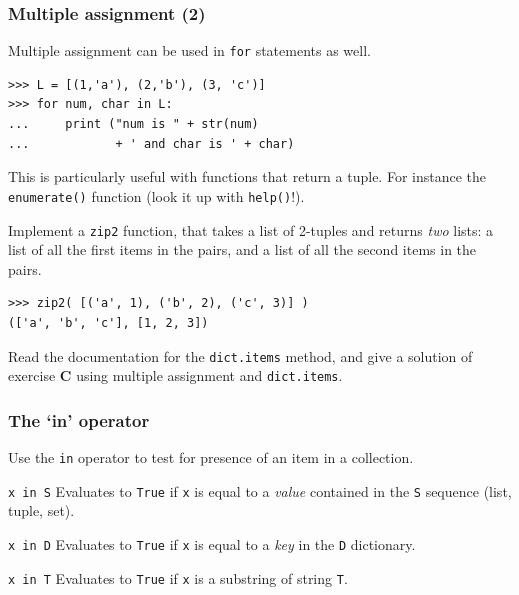\documentclass[english,serif,mathserif,xcolor=pdftex,dvipsnames,table]{beamer}
\begin{document}
\begin{frame}[fragile]
\frametitle{Multiple assignment (2)}
Multiple assignment can be used in \texttt{for} statements as well.
\begin{lstlisting}
>>> L = [(1,'a'), (2,'b'), (3, 'c')]
>>> for num, char in L:
...     print ("num is " + str(num)
...            + ' and char is ' + char)
\end{lstlisting}

  \+
  This is particularly useful with functions that return a tuple.
  For instance the \texttt{enumerate()} function (look it up with
  \texttt{help()}!).
\end{frame}

\begin{frame}[fragile]

  \begin{exercise}
    Implement a \texttt{zip2} function, that takes a list of 2-tuples
    and returns \emph{two} lists: a list of all the first items in the
    pairs, and a list of all the second items in the pairs.

    \begin{lstlisting}
>>> zip2( [('a', 1), ('b', 2), ('c', 3)] )
(['a', 'b', 'c'], [1, 2, 3])      
    \end{lstlisting}
  \end{exercise}

  \+
  \begin{exercise}
    Read the documentation for the \texttt{dict.items} method, and
    give a solution of exercise \textbf{C} using multiple assignment
    and \texttt{dict.items}.
  \end{exercise}
\end{frame}


\begin{frame}[fragile]
  \frametitle{The `{\ttfamily\bfseries in}' operator}

  Use the \lstinline|in| operator to test for presence of an item in a
  collection.

  \begin{describe}{\lstinline|x in S|}
    Evaluates to \texttt{True} if \lstinline|x| is equal to a \emph{value}
    contained in the \lstinline|S| sequence (list, tuple, set).
  \end{describe}

  \begin{describe}{\lstinline|x in D|}
    Evaluates to \texttt{True} if \lstinline|x| is equal to a \emph{key}
    in the \lstinline|D| dictionary.
  \end{describe}

  \begin{describe}{\lstinline|x in T|}
    Evaluates to \texttt{True} if \lstinline|x| is a substring of
    string \lstinline|T|.
  \end{describe}

\end{frame}
\end{document}
